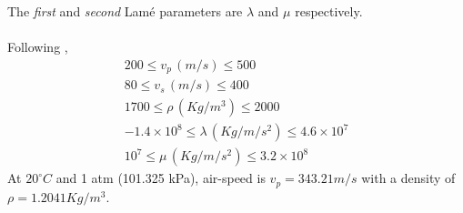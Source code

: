 \documentclass[a4paper,12pt]{article}
\begin{document}
 The {\it first} and {\it second} Lam\'e parameters are $\lambda$ and $\mu$ respectively. 
\\\\
Following \cite{groos2017application},
\begin{align}
200\leq v_p\, (m/s)\leq 500 \\
80\leq v_s\, (m/s)\leq 400\\
1700\leq \rho \, (Kg/m^3)\leq 2000\\
-1.4\times 10^8 \leq \lambda\,(Kg/m/s^2) \leq 4.6 \times 10^7 \\
10^7 \leq \mu\,(Kg/m/s^2)\leq 3.2\times 10^8 
\end{align}
At $20^{\circ}C$ and 1 atm (101.325 kPa), air-speed is $v_p=343.21 m/s$ with a density of $\rho=1.2041Kg/m^3$.
%
%


\end{document}

